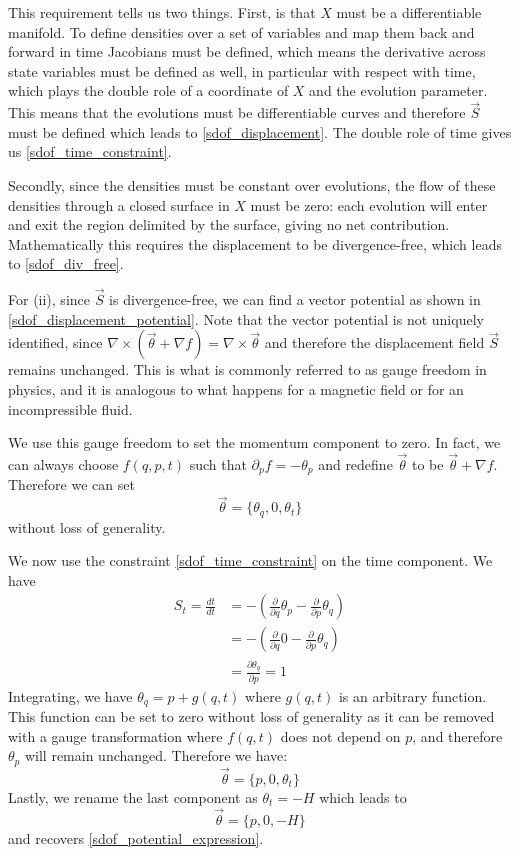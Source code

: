 \documentclass[10pt,twocolumn, nofootinbib]{revtex4-2}
\begin{document}
This requirement tells us two things. First, is that $X$ must be a differentiable manifold. To define densities over a set of variables and map them back and forward in time Jacobians must be defined, which means the derivative across state variables must be defined as well, in particular with respect with time, which plays the double role of a coordinate of $X$ and the evolution parameter. This means that the evolutions must be differentiable curves and therefore $\vec{S}$ must be defined which leads to \ref{sdof_displacement}. The double role of time gives us \ref{sdof_time_constraint}.

Secondly, since the densities must be constant over evolutions, the flow of these densities through a closed surface in $X$ must be zero: each evolution will enter and exit the region delimited by the surface, giving no net contribution. Mathematically this requires the displacement to be divergence-free, which leads to \ref{sdof_div_free}.

For (ii), since $\vec{S}$ is divergence-free, we can find a vector potential as shown in \ref{sdof_displacement_potential}. Note that the vector potential is not uniquely identified, since $\nabla \times(\vec{\theta} + \nabla f) = \nabla \times \vec{\theta}$ and therefore the displacement field $\vec{S}$ remains unchanged. This is what is commonly referred to as gauge freedom in physics, and it is analogous to what happens for a magnetic field or for an incompressible fluid.

We use this gauge freedom to set the momentum component to zero. In fact, we can always choose $f(q,p,t)$ such that $\partial_p f = -\theta_p$ and redefine $\vec{\theta}$ to be $\vec{\theta} + \nabla f$. Therefore we can set
\begin{equation*}
	\vec{\theta} = \{\theta_q, 0, \theta_t\}
\end{equation*}
without loss of generality.

We now use the constraint \ref{sdof_time_constraint} on the time component. We have
\begin{align*}
	S_t = \frac{dt}{dt} &= - \left(\frac{\partial}{\partial q}  \theta_p - \frac{\partial}{\partial p}  \theta_q\right) \\
	&= - \left(\frac{\partial}{\partial q}  0 - \frac{\partial}{\partial p}  \theta_q\right) \\
	& = \frac{\partial \theta_q}{\partial p} = 1
\end{align*}
Integrating, we have $\theta_q = p + g(q,t)$ where $g(q,t)$ is an arbitrary function. This function can be set to zero without loss of generality as it can be removed with a gauge transformation where $f(q,t)$ does not depend on $p$, and therefore $\theta_p$ will remain unchanged. Therefore we have:
\begin{equation*}
	\vec{\theta} = \{p, 0, \theta_t\}
\end{equation*}
Lastly, we rename the last component as $\theta_t = -H$ which leads to 
\begin{equation*}
	\vec{\theta} = \{p, 0, -H\}
\end{equation*}
and recovers \ref{sdof_potential_expression}.
\end{document}
